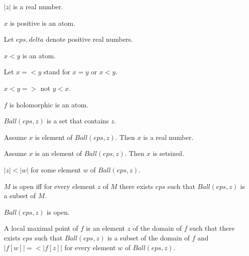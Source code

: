 \documentclass{article}
\begin{document}
\begin{forthel}
    \begin{signature}
      $|z|$ is a real number.
    \end{signature}

    \begin{signature}
      $x$ is positive is an atom.
    \end{signature}

    Let $eps, delta$ denote positive real numbers.

    \begin{signature}
      $x < y$ is an atom.
    \end{signature}

    Let $x =< y$ stand for $x = y$ or $x < y$.

    \begin{axiom}
      $x < y =>$ not $y < x$.
    \end{axiom}

    \begin{signature}
      $f$ is holomorphic is an atom.
    \end{signature}

    \begin{signature}
      $Ball(eps,z)$ is a set that contains $z$.
    \end{signature}

    \begin{axiom}
      Assume $x$ is element of $Ball(eps, z)$. Then $x$ is a real number.
    \end{axiom}

    \begin{lemma}
      Assume $x$ is an element of $Ball(eps, z)$. Then $x$ is setsized.
    \end{lemma}

    \begin{axiom}
      $|z| < |w|$ for some element $w$ of $Ball(eps,z)$.
    \end{axiom}

    \begin{definition}
      $M$ is open iff for every element $z$ of $M$ there exists $eps$ such that $Ball(eps,z)$ is a subset of $M$.
    \end{definition}

    \begin{axiom}
      $Ball(eps,z)$ is open.
    \end{axiom}

    \begin{definition}
      A local maximal point of $f$ is an element $z$ of the domain of $f$ such that there exists $eps$ such that $Ball(eps,z)$ is a subset of the domain of $f$ and $|f[w]| =< |f[z]|$ for every element $w$ of $Ball(eps,z)$.
    \end{definition}


\end{forthel}
\end{document}
